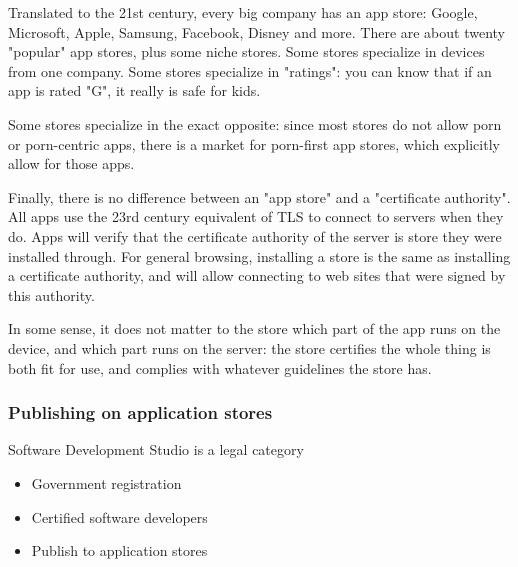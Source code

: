 Translated to the 21st century,
every big company has an app store:
Google, Microsoft, Apple, Samsung,
Facebook, Disney and more.
There are about twenty "popular" app stores,
plus some niche stores.
Some stores specialize in devices from one company.
Some stores specialize in "ratings":
you can know that if an app is rated "G",
it really is safe for kids.

Some stores specialize in the exact opposite:
since most stores do not allow porn or porn-centric apps,
there is a market for porn-first app stores,
which explicitly allow for those apps.

Finally,
there is no difference between an "app store"
and a "certificate authority".
All apps use the 23rd century equivalent of TLS to connect to servers
when they do.
Apps will verify that the certificate authority of the server
is store they were installed through.
For general browsing,
installing a store is the same as installing a certificate authority,
and will allow connecting to web sites that were signed by this
authority.

In some sense,
it does not matter to the store which part of the app runs on the device,
and which part runs on the server:
the store certifies the whole thing is both fit for use,
and complies with whatever guidelines the store has.

\begin{frame}[fragile]
\frametitle{Publishing on application stores}

Software Development Studio is a legal category

\end{frame}

\begin{itemize}
\item Government registration
\item Certified software developers
\item Publish to application stores
\end{itemize}

